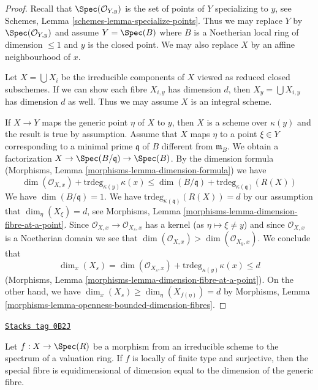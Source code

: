 \begin{proof}
Recall that $\Spec(\mathcal{O}_{Y, y})$
is the set of points of $Y$ specializing to $y$, see
Schemes, Lemma \ref{schemes-lemma-specialize-points}.
Thus we may replace $Y$ by $\Spec(\mathcal{O}_{Y, y})$
and assume $Y = \Spec(B)$ where $B$ is a Noetherian
local ring of dimension $\leq 1$ and $y$ is the closed point.
We may also replace $X$ by an affine neighbourhood of $x$.

\medskip\noindent
Let $X = \bigcup X_i$ be the irreducible components of $X$ viewed
as reduced closed subschemes. If we can show each fibre $X_{i, y}$
has dimension $d$, then $X_y = \bigcup X_{i, y}$ has dimension $d$ as
well. Thus we may assume $X$ is an integral scheme.

\medskip\noindent
If $X \to Y$ maps the generic point $\eta$ of $X$ to $y$, then $X$
is a scheme over $\kappa(y)$ and the result is true by assumption.
Assume that $X$ maps $\eta$ to a point $\xi \in Y$ corresponding
to a minimal prime $\mathfrak q$ of $B$ different from $\mathfrak m_B$.
We obtain a factorization $X \to \Spec(B/\mathfrak q) \to \Spec(B)$.
By the dimension formula
(Morphisms, Lemma \ref{morphisms-lemma-dimension-formula})
we have
$$
\dim(\mathcal{O}_{X, x}) + \text{trdeg}_{\kappa(y)} \kappa(x) \leq
\dim(B/\mathfrak q) + \text{trdeg}_{\kappa(\mathfrak q)}(R(X))
$$
We have $\dim(B/\mathfrak q) = 1$. We have
$\text{trdeg}_{\kappa(\mathfrak q)}(R(X)) = d$ by
our assumption that $\dim_\eta(X_\xi) = d$, see
Morphisms, Lemma \ref{morphisms-lemma-dimension-fibre-at-a-point}.
Since $\mathcal{O}_{X, x} \to \mathcal{O}_{X_s, x}$ has a kernel
(as $\eta \mapsto \xi \not = y$) and since $\mathcal{O}_{X, x}$
is a Noetherian domain we see that
$\dim(\mathcal{O}_{X, x}) > \dim(\mathcal{O}_{X_y, x})$.
We conclude that
$$
\dim_x(X_s) =
\dim(\mathcal{O}_{X_s, x}) + \text{trdeg}_{\kappa(y)} \kappa(x) \leq d
$$
(Morphisms, Lemma \ref{morphisms-lemma-dimension-fibre-at-a-point}).
On the other hand, we have
$\dim_x(X_s) \geq \dim_\eta(X_{f(\eta)}) = d$ by
Morphisms, Lemma \ref{morphisms-lemma-openness-bounded-dimension-fibres}.
\end{proof}

\begin{lemma}
\label{varieties-lemma-dominate-valuation-ring-dimension-fibres}
\href{https://stacks.math.columbia.edu/tag/0B2J}{\texttt{Stacks tag 0B2J}}

Let $f : X \to \Spec(R)$ be a morphism from an irreducible
scheme to the spectrum of a valuation ring. If $f$ is locally
of finite type and surjective, then the special fibre is
equidimensional of dimension equal to the dimension of the generic fibre.
\end{lemma}

